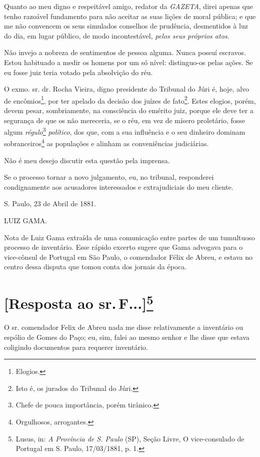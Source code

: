 Quanto ao meu digno e respeitável amigo, redator da \emph{GAZETA}, direi
apenas que tenho razoável fundamento para não aceitar as suas lições de
moral pública; e que me não convencem os seus simulados conselhos de
prudência, desmentidos à luz do dia, em lugar público, de modo
incontestável, \emph{pelos seus próprios atos}.

Não invejo a nobreza de sentimentos de pessoa alguma. Nunca possuí
escravos. Estou habituado a medir os homens por um só nível:
distinguo-os pelas ações. Se eu fosse juiz teria votado pela absolvição
do réu.

O exmo. sr. dr. Rocha Vieira, digno presidente do Tribunal do Júri é,
hoje, alvo de encômios\footnote{Elogios.}, por ter apelado da decisão
dos juízes de fato\footnote{Isto é, os jurados do Tribunal do Júri.}.
Estes elogios, porém, devem pesar, sombriamente, na consciência do
emérito juiz, porque ele deve ter a segurança de que os não mereceria,
se o réu, em vez de mísero proletário, fosse algum
\emph{régulo}\footnote{Chefe de pouca importância, porém tirânico.}
\emph{político}, dos que, com a sua influência e o seu dinheiro dominam
sobranceiros\footnote{Orgulhosos, arrogantes.}
as populações e alinham as
conveniências judiciárias.

Não é meu desejo discutir esta questão pela imprensa.

Se o processo tornar a novo julgamento, eu, no tribunal, responderei
condignamente aos acusadores interessados e extrajudiciais do meu
cliente.

S. Paulo, 23 de Abril de 1881.

LUIZ GAMA.

\pagebreak
\mbox{}\vfill
\thispagestyle{empty}

{\small\noindent
Nota de Luiz Gama extraída de uma comunicação entre partes de um
tumultuoso processo de inventário. Esse rápido excerto sugere que Gama
advogava para o vice-cônsul de Portugal em São Paulo, o comendador Félix
de Abreu, e estava no centro dessa disputa que tomou conta dos jornais
da época.}

\chapter{{[}Resposta ao sr.\,F...{]}\footnote[*]{Lusus, in: \emph{A Província de S. Paulo} (SP), Seção Livre, O vice-consulado de Portugal em S. Paulo, 17/03/1881, p.
  1.}}


O sr. comendador Felix de Abreu nada me disse relativamente a inventário
ou espólio de Gomes do Paço; eu, sim, falei ao mesmo senhor e lhe disse
que estava coligindo documentos para requerer inventário.

